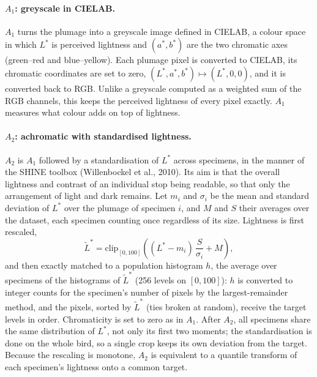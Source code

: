 \paragraph{$A_1$: greyscale in CIELAB.}
$A_1$ turns the plumage into a greyscale image defined in CIELAB, a colour space
in which $L^*$ is perceived lightness and $(a^*, b^*)$ are the two chromatic
axes (green--red and blue--yellow). Each plumage pixel is converted to CIELAB,
its chromatic coordinates are set to zero,
$(L^*, a^*, b^*) \mapsto (L^*, 0, 0)$, and it is converted back to RGB. Unlike
a greyscale computed as a weighted sum of the RGB channels, this keeps the
perceived lightness of every pixel exactly. $A_1$ measures what colour adds on
top of lightness.

\paragraph{$A_2$: achromatic with standardised lightness.}
$A_2$ is $A_1$ followed by a standardisation of $L^*$ across specimens, in the
manner of the SHINE toolbox (Willenbockel et al., 2010). Its aim is that the
overall lightness and contrast of an individual stop being readable, so that
only the arrangement of light and dark remains. Let $m_i$ and $\sigma_i$ be the
mean and standard deviation of $L^*$ over the plumage of specimen $i$, and $M$
and $S$ their averages over the dataset, each specimen counting once regardless
of its size. Lightness is first rescaled,
\begin{equation}
  \tilde L^* = \mathrm{clip}_{[0, 100]}\!\left( (L^* - m_i)\, \frac{S}{\sigma_i} + M \right),
\end{equation}
and then exactly matched to a population histogram $h$, the average over
specimens of the histograms of $\tilde L^*$ (256 levels on $[0, 100]$): $h$ is
converted to integer counts for the specimen's number of pixels by the
largest-remainder method, and the pixels, sorted by $\tilde L^*$ (ties broken at
random), receive the target levels in order. Chromaticity is set to zero as in
$A_1$. After $A_2$, all specimens share the same distribution of $L^*$, not only
its first two moments; the standardisation is done on the whole bird, so a
single crop keeps its own deviation from the target. Because the rescaling is
monotone, $A_2$ is equivalent to a quantile transform of each specimen's
lightness onto a common target.

